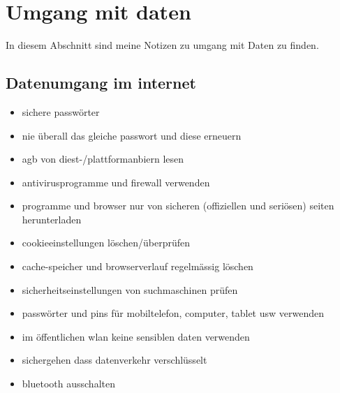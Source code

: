 \section{Umgang mit daten}
\label{sec:Data}

In diesem Abschnitt sind meine Notizen zu umgang mit Daten zu finden.

\subsection{Datenumgang im internet}
\begin{itemize}
    \item sichere passwörter
    \item nie überall das gleiche passwort und diese erneuern
    \item agb von diest-/plattformanbiern lesen
    \item antivirusprogramme und firewall verwenden
    \item programme und browser nur von sicheren (offiziellen und seriösen) seiten herunterladen
    \item cookieeinstellungen löschen/überprüfen
    \item cache-speicher und browserverlauf regelmässig löschen
    \item sicherheitseinstellungen von suchmaschinen prüfen
    \item passwörter und pins für mobiltelefon, computer, tablet usw verwenden
    \item im öffentlichen wlan keine sensiblen daten verwenden
    \item sichergehen dass datenverkehr verschlüsselt
    \item bluetooth ausschalten
\end{itemize}
\citep{datenschutz}
